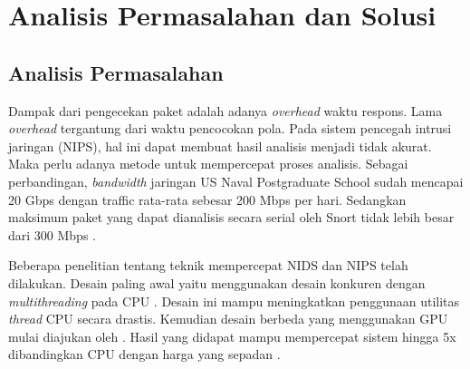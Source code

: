 
\chapter{Analisis Permasalahan dan Solusi}


  \section{Analisis Permasalahan}
  


    Dampak dari pengecekan paket adalah adanya \emph{overhead} waktu respons. Lama \emph{overhead} tergantung dari waktu pencocokan pola. Pada sistem pencegah intrusi jaringan (NIPS), hal ini dapat membuat hasil analisis menjadi tidak akurat. Maka perlu adanya metode untuk mempercepat proses analisis. Sebagai perbandingan, \emph{bandwidth} jaringan US Naval Postgraduate School sudah mencapai 20 Gbps dengan traffic rata-rata sebesar 200 Mbps per hari. Sedangkan maksimum paket yang dapat dianalisis secara serial oleh Snort tidak lebih besar dari 300 Mbps \citep{albin2012}.

    Beberapa penelitian tentang teknik mempercepat NIDS dan NIPS telah dilakukan. Desain paling awal yaitu menggunakan desain konkuren dengan \emph{multithreading} pada CPU \citep{multi2004}. Desain ini mampu meningkatkan penggunaan utilitas \emph{thread} CPU secara drastis. Kemudian desain berbeda yang menggunakan GPU mulai diajukan oleh \cite{gnort2008}. Hasil yang didapat mampu mempercepat sistem hingga 5x dibandingkan CPU dengan harga yang sepadan \citep{smith2009}.


